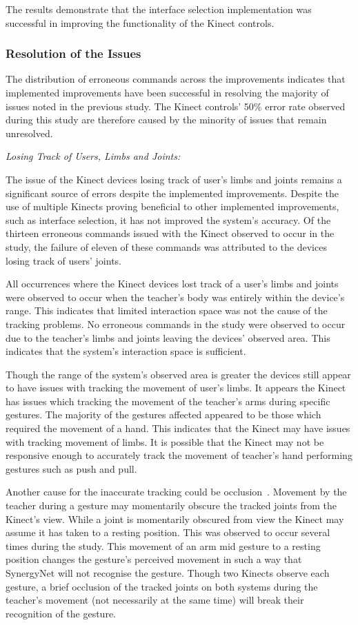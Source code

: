 \documentclass[link]{IWCOMP}
\begin{document}
The results demonstrate that the interface selection implementation was successful in improving the functionality of the Kinect controls.

\subsubsection{Resolution of the Issues}
\label{subsubsec:studyPhase2ObservationsResolution}

The distribution of erroneous commands across the improvements indicates that implemented improvements have been successful in resolving the majority of issues noted in the previous study.
The Kinect controls' 50\% error rate observed during this study are therefore caused by the minority of issues that remain unresolved.

\emph{Losing Track of Users, Limbs and Joints:}

The issue of the Kinect devices losing track of user's limbs and joints remains a significant source of errors despite the implemented improvements.
Despite the use of multiple Kinects proving beneficial to other implemented improvements, such as interface selection, it has not improved the system's accuracy.
Of the thirteen erroneous commands issued with the Kinect observed to occur in the study, the failure of eleven of these commands was attributed to the devices losing track of users' joints.

All occurrences where the Kinect devices lost track of a user's limbs and joints were observed to occur when the teacher's body was entirely within the device's range.
This indicates that limited interaction space was not the cause of the tracking problems.
No erroneous commands in the study were observed to occur due to the teacher's limbs and joints leaving the devices' observed area.
This indicates that the system's interaction space is sufficient.

Though the range of the system's observed area is greater the devices still appear to have issues with tracking the movement of user's limbs.
It appears the Kinect has issues which tracking the movement of the teacher's arms during specific gestures.
The majority of the gestures affected appeared to be those which required the movement of a hand.
This indicates that the Kinect may have issues with tracking movement of limbs.
It is possible that the Kinect may not be responsive enough to accurately track the movement of teacher's hand performing gestures such as push and pull.

Another cause for the inaccurate tracking could be occlusion~\cite{Meng2012}.
Movement by the teacher during a gesture may momentarily obscure the tracked joints from the Kinect's view.
While a joint is momentarily obscured from view the Kinect may assume it has taken to a resting position.
This was observed to occur several times during the study.
This movement of an arm mid gesture to a resting position changes the gesture's perceived movement in such a way that SynergyNet will not recognise the gesture.
Though two Kinects observe each gesture, a brief occlusion of the tracked joints on both systems during the teacher's movement (not necessarily at the same time) will break their recognition of the gesture.
\end{document}
